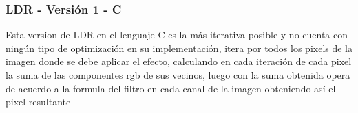 \subsubsection{LDR - Versión 1 - C}
\label{sec:LDRC1}
Esta version de LDR en el lenguaje C es la más iterativa posible y no cuenta con ningún tipo de optimización en su implementación, itera por todos los pixels de la imagen donde se debe aplicar el efecto, calculando en cada iteración de cada pixel la suma de las componentes rgb de sus vecinos, luego con la suma obtenida opera de acuerdo a la formula del filtro en cada canal de la imagen obteniendo así el pixel resultante